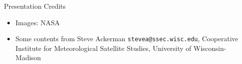 \documentclass[ignorenonframetext,]{beamer}
\begin{document}
\begin{frame}{Presentation Credits}

\begin{itemize}
\itemsep1pt\parskip0pt
\item
  Images: NASA
\item
  Some contents from Steve Ackerman \texttt{stevea@ssec.wisc.edu},
  Cooperative Institute for Meteorological Satellite Studies, University
  of Wisconsin-Madison
\end{itemize}

\end{frame}
\end{document}
